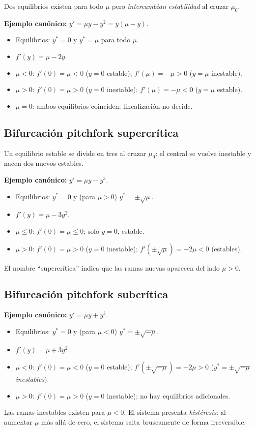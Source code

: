\documentclass[11pt,letterpaper]{article}
\begin{document}
Dos equilibrios existen para todo $\mu$ pero \emph{intercambian estabilidad}
al cruzar $\mu_0$.

\textbf{Ejemplo canónico:} $y'=\mu y-y^2=y(\mu-y)$.
\begin{itemize}
    \item Equilibrios: $y^*=0$ y $y^*=\mu$ para todo $\mu$.
    \item $f'(y)=\mu-2y$.
    \item $\mu<0$: $f'(0)=\mu<0$ ($y=0$ estable); $f'(\mu)=-\mu>0$ ($y=\mu$ inestable).
    \item $\mu>0$: $f'(0)=\mu>0$ ($y=0$ inestable); $f'(\mu)=-\mu<0$ ($y=\mu$ estable).
    \item $\mu=0$: ambos equilibrios coinciden; linealización no decide.
\end{itemize}

\subsection{Bifurcación pitchfork supercrítica}

Un equilibrio estable se divide en tres al cruzar $\mu_0$: el central se
vuelve inestable y nacen dos nuevos estables.

\textbf{Ejemplo canónico:} $y'=\mu y-y^3$.
\begin{itemize}
    \item Equilibrios: $y^*=0$ y (para $\mu>0$) $y^*=\pm\sqrt{\mu}$.
    \item $f'(y)=\mu-3y^2$.
    \item $\mu\leq 0$: $f'(0)=\mu\leq 0$; solo $y=0$, estable.
    \item $\mu>0$: $f'(0)=\mu>0$ ($y=0$ inestable); $f'(\pm\sqrt{\mu})=-2\mu<0$ (estables).
\end{itemize}
El nombre ``supercrítica'' indica que las ramas nuevas aparecen del lado $\mu>0$.

\subsection{Bifurcación pitchfork subcrítica}

\textbf{Ejemplo canónico:} $y'=\mu y+y^3$.
\begin{itemize}
    \item Equilibrios: $y^*=0$ y (para $\mu<0$) $y^*=\pm\sqrt{-\mu}$.
    \item $f'(y)=\mu+3y^2$.
    \item $\mu<0$: $f'(0)=\mu<0$ ($y=0$ estable); $f'(\pm\sqrt{-\mu})=-2\mu>0$
          ($y^*=\pm\sqrt{-\mu}$ \emph{inestables}).
    \item $\mu>0$: $f'(0)=\mu>0$ ($y=0$ inestable); no hay equilibrios adicionales.
\end{itemize}
Las ramas inestables existen para $\mu<0$. El sistema presenta \emph{histéresis}:
al aumentar $\mu$ más allá de cero, el sistema salta bruscamente de forma irreversible.
\end{document}
